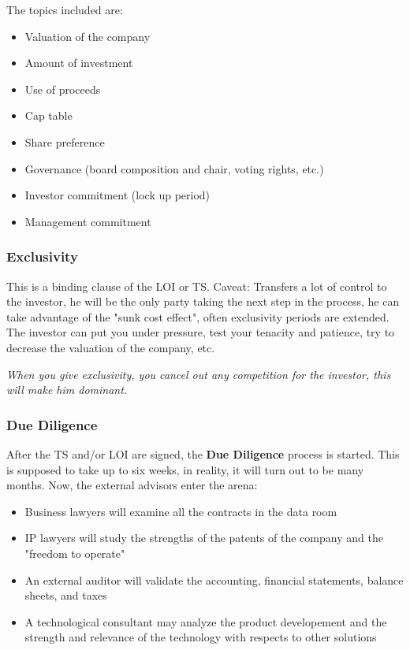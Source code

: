 \documentclass[a4paper]{extarticle}
\begin{document}
The topics included are:

\begin{itemize}
    \item Valuation of the company
    \item Amount of investment
    \item Use of proceeds
    \item Cap table
    \item Share preference
    \item Governance (board composition and chair, voting rights, etc.)
    \item Investor commitment (lock up period)
    \item Management commitment
\end{itemize}

\subsubsection{Exclusivity}

This is a binding clause of the LOI or TS. Caveat: Transfers a lot of control to the investor, he will be the only party taking the next step in the process, he can take advantage of the "sunk cost effect", often exclusivity periods are extended. The investor can put you under pressure, test your tenacity and patience, try to decrease the valuation of the company, etc.

\textit{When you give exclusivity, you cancel out any competition for the investor, this will make him dominant.}

\subsubsection{Due Diligence}

After the TS and/or LOI are signed, the \textbf{Due Diligence} process is started. This is supposed to take up to six weeks, in reality, it will turn out to be many months. Now, the external advisors enter the arena:

\begin{itemize}
    \item Business lawyers will examine all the contracts in the data room
    \item IP lawyers will study the strengths of the patents of the company and the "freedom to operate"
    \item An external auditor will validate the accounting, financial statements, balance sheets, and taxes
    \item A technological consultant may analyze the product developement and the strength and relevance of the technology with respects to other solutions
\end{itemize}
\end{document}
